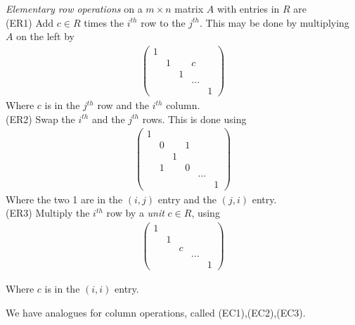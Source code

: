 \documentclass[a4paper]{article}
\begin{document}
\begin{defi} 
\emph{Elementary row operations} on a $m\times n$ matrix $A$ with entries in $R$ are\\
(ER1) Add $c\in R$ times the $i^{th}$ row to the $j^{th}$. This may be done by multiplying $A$ on the left by
\begin{equation*}
\begin{aligned}
\left(
\begin{matrix}
1 & & &  & \\
  &1& &  c  &\\
  & &1&  & \\
  & & & ... & \\
  & & &  &1
\end{matrix}
\right)
\end{aligned}
\end{equation*}
Where $c$ is in the $j^{th}$ row and the $i^{th}$ column.\\
(ER2) Swap the $i^{th}$ and the $j^{th}$ rows. This is done using
\begin{equation*}
\begin{aligned}
\left(
\begin{matrix}
1 & & &  & & \\
  &0& &1 & &\\
  & &1&  & &\\
  &1& & 0& &\\
  & & & & ...&\\
  & & &  & & 1
\end{matrix}
\right)
\end{aligned}
\end{equation*}
Where the two 1 are in the $(i,j)$ entry and the $(j,i)$ entry.\\
(ER3) Multiply the $i^{th}$ row by a \emph{unit} $c\in R$, using
\begin{equation*}
\begin{aligned}
\left(
\begin{matrix}
1 & & &  & \\
  &1& &  &\\
  & &c&  & \\
  & & & ... & \\
  & & &  &1
\end{matrix}
\right)
\end{aligned}
\end{equation*}
\end{defi}
Where $c$ is in the $(i,i)$ entry.

We have analogues for column operations, called (EC1),(EC2),(EC3).
\end{document}
